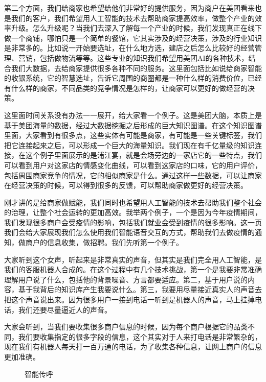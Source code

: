 \documentclass[letterpaper,10pt,english]{sphinxmanual}
\begin{document}
第二个方面，我们给商家也希望给他们非常好的提供服务，因为商户在美团看来也是我们的客户，我们希望用人工智能的技术去帮助商家提高效率，做整个产业的效率升级。怎么升级呢？当我们去深入了解每一个产业的时候，我们发现真正在线下做一个商铺，哪怕只是一个简单的餐馆，它其实涉及的经营决策，涉及的行业知识是非常多的。比如说一开始要选址，在什么地方选，建店之后怎么比较好的经营管理、营销，包括做物流等等。这些专业的知识我们希望用美团AI的各种技术，结合我们大数据，去给商家提供很多各种不同的服务。这里面包括比如说给商家智能的收银系统，它的智慧选址，告诉它周围的商圈都是一种什么样的消费价位，已经有什么样的商家，不同品类的竞争情况是怎样的，让商家可以更好的做经营的决策。

这里面时间关系没有办法一一展开，给大家看一个例子。这是美团大脑，本质上是基于美团海量的数据，经过大数据挖掘之后形成的巨大知识图谱。在这个知识图谱里面，大家看到有很多点，这些实体有可能是商家，有可能是一些关键标签，我们把它连接起来之后，可以形成一个巨大的海量知识。我们现在有千亿量级的知识连接，在这个例子里面展示的是浦江宴，就是会场旁边的一家店它的一些特点，我们可以看到用户对这家店的情感变化曲线，可以看到这家店的口味，它的用户评价，包括周围商家竞争的情况，它的相似商家是什么。通过这样一些数据，可以让商家在经营决策的时候，可以得到很多的反馈，可以帮助商家做更好的经营决策。

刚才讲的是给商家做赋能，我们同时也希望用人工智能的技术去帮助我们整个社会的治理，让整个社会运转的更加高效。我举两个例子，一个是因为今年疫情期间，我们发现很多商户会受疫情的影响，包括我们就业会受到疫情的很多影响。这一页我们会给大家展现我们怎么使用我们智能语音交互的方式，帮助我们去做疫情的通知，做商户的信息收集，做招聘。我们先听第一个例子。

大家听到这个女声，听起来是非常真实的声音，但其实是我们完全用人工智能，是我们的客服机器人合成的。在这个过程中有几个技术挑战，第一个是我要非常准确理解用户说了什么，包括他的背景噪音、方言都要适应。第二，基于用户说的内容，基于我背后的知识库产生我要说什么。第三，我要用尽量接近真实人的声音去把这个声音说出来。因为很多用户一接到电话一听到是机器人的声音，马上挂掉电话，我们还要尽量逼近人的声音。

大家会听到，当我们要收集很多商户信息的时候，因为每个商户根据它的品类不同，我们要收集指定的很多字段的信息，这个其实对于人来打电话是非常繁杂的，现在我们有机器人每天打一百万通的电话，为了收集各种信息，让网上商户的信息更加准确。

\begin{figure}[H]
\centering
\capstart

\noindent{}
\caption{智能传呼}\label{\detokenize{chapter_AI_company/meituan:id26}}\end{figure}
\end{document}
